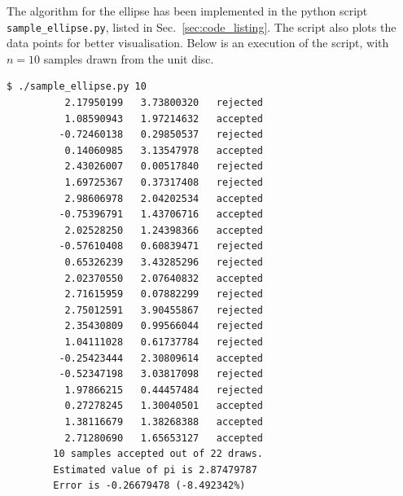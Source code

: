 \documentclass[10pt]{article}
\begin{document}
    The algorithm for the ellipse has been implemented in the python script
    \texttt{sample\_ellipse.py}, listed in Sec.~\ref{sec:code_listing}. The script
    also plots the data points for better visualisation. Below is an execution of the
    script, with $n = 10$ samples drawn from the unit disc.
    
    \begin{lstlisting}[numbers=none, basicstyle=\ttfamily]
        $ ./sample_ellipse.py 10
          2.17950199   3.73800320   rejected
          1.08590943   1.97214632   accepted
         -0.72460138   0.29850537   rejected
          0.14060985   3.13547978   accepted
          2.43026007   0.00517840   rejected
          1.69725367   0.37317408   rejected
          2.98606978   2.04202534   accepted
         -0.75396791   1.43706716   accepted
          2.02528250   1.24398366   accepted
         -0.57610408   0.60839471   rejected
          0.65326239   3.43285296   rejected
          2.02370550   2.07640832   accepted
          2.71615959   0.07882299   rejected
          2.75012591   3.90455867   rejected
          2.35430809   0.99566044   rejected
          1.04111028   0.61737784   rejected
         -0.25423444   2.30809614   accepted
         -0.52347198   3.03817098   rejected
          1.97866215   0.44457484   rejected
          0.27278245   1.30040501   accepted
          1.38116679   1.38268388   accepted
          2.71280690   1.65653127   accepted
        10 samples accepted out of 22 draws.
        Estimated value of pi is 2.87479787
        Error is -0.26679478 (-8.492342%)
    \end{lstlisting}
    
\end{document}
